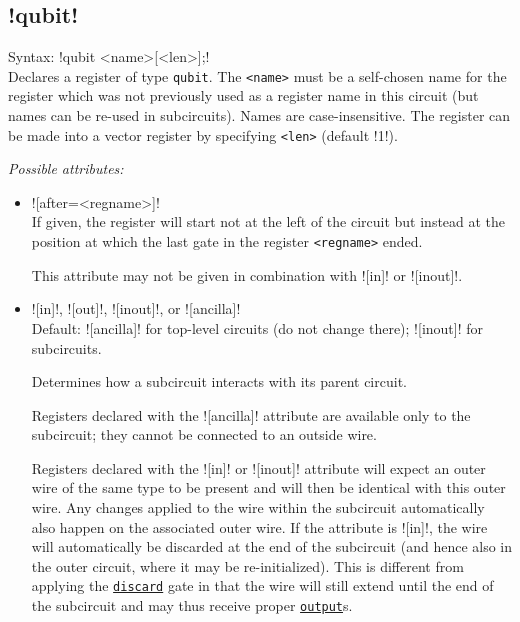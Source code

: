 \documentclass{scrartcl}
\def\gate#1{\hyperref[gate:#1]{\texttt{#1}}}
\begin{document}
      \subsection{\texorpdfstring{\yquant!qubit!}{qubit}}\label{gate:qubit}
         Syntax: \yquant!qubit <name>[<len>];! \\
         Declares a register of type \texttt{qubit}.
         The \texttt{<name>} must be a self\hyp chosen name for the register which was not previously used as a register name in this circuit (but names can be re\hyp used in subcircuits).
         Names are case\hyp insensitive.
         The register can be made into a vector register by specifying \texttt{<len>} (default \tex!1!).

         \emph{Possible attributes:}
         \begin{itemize}
            \item \yquant![after=<regname>]! \\
               If given, the register will start not at the left of the circuit but instead at the position at which the last gate in the register \texttt{<regname>} ended.

               This attribute may not be given in combination with \yquant![in]! or \yquant![inout]!.
            \item {}\yquant![in]!, \yquant![out]!, \yquant![inout]!, or \yquant![ancilla]! \\
               Default: \yquant![ancilla]! for top\hyp level circuits (do not change there); \yquant![inout]! for subcircuits.

               Determines how a subcircuit interacts with its parent circuit.

               Registers declared with the \yquant![ancilla]! attribute are available only to the subcircuit; they cannot be connected to an outside wire.

               Registers declared with the \yquant![in]! or \yquant![inout]! attribute will expect an outer wire of the same type to be present and will then be identical with this outer wire.
               Any changes applied to the wire within the subcircuit automatically also happen on the associated outer wire.
               If the attribute is \yquant![in]!, the wire will automatically be discarded at the end of the subcircuit (and hence also in the outer circuit, where it may be re\hyp initialized).
               This is different from applying the \gate{discard} gate in that the wire will still extend until the end of the subcircuit and may thus receive proper \gate{output}s.


\end{itemize}
\end{document}
